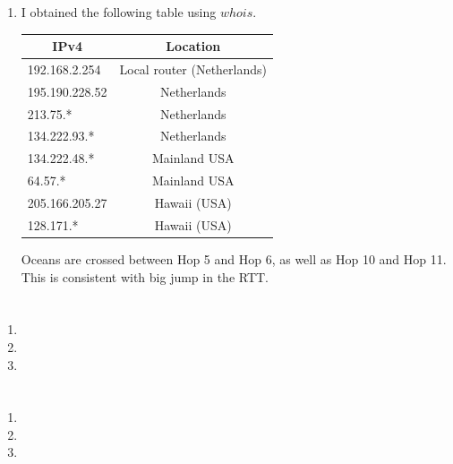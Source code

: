 \documentclass[12pt, a4paper]{article}
\begin{document}
\begin{enumerate}[a]
	\item %
	\begin{multicols}{2}
		I obtained the following table using $whois$.

		\begin{tabular}{l|c}
		\multicolumn{1}{c|}{IPv4} & Location\\\hline
		192.168.2.254 & Local router (Netherlands)\\
		195.190.228.52 & Netherlands\\
		213.75.* & Netherlands\\
		134.222.93.* & Netherlands\\
		134.222.48.* & Mainland USA\\
		64.57.* & Mainland USA\\
		205.166.205.27 & Hawaii (USA)\\
		128.171.* & Hawaii (USA)
		\end{tabular}

		Oceans are crossed between Hop 5 and Hop 6, as well as Hop 10 and Hop 11. This is consistent with big jump in the RTT.
	\end{multicols}
\end{enumerate}

\section{} %
\begin{enumerate}[a]
	\item %
	\item %
	\item %
\end{enumerate}

\section{} %
\begin{enumerate}[a]
	\item %
	\item %
	\item %
\end{enumerate}
\end{document}
